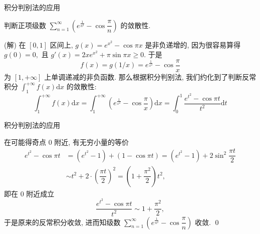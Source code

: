 \begin{frame}{积分判别法的应用}

\begin{eg}
\begin{center}
判断正项级数 $\sum\limits_{n=1}^\infty \left( e^{\frac{1}{n^2}} - \cos\dfrac{\pi}{n} \right)$ 的敛散性.
\end{center}
\end{eg}

\pause
\vspace{0.6em}

\startproof[bg=yellow, fg=red](解)
在 $[0, 1]$ 区间上, $g(x) = e^{x^2} - \cos\pi x$ 是非负递增的, 因为很容易算得 $g(0) = 0,$ 且 $g'(x) = 2xe^{x^2} + \pi \sin\pi x \geqslant 0.$ 于是
\[f(x) = g(1/x) = e^{\frac{1}{x^2}} - \cos\dfrac{\pi}{x}\]
为 $[1, +\infty]$ 上单调递减的非负函数. 那么根据积分判别法, 我们约化到了判断反常积分 $\displaystyle \int_1^{+\infty} f(x) \mathrm{d} x$ 的敛散性:
\[
\int_1^{+\infty} f(x) \mathrm{d} x = \int_1^{+\infty} \left( e^{\frac{1}{x^2}} - \cos\dfrac{\pi}{x} \right) \mathrm{d} x = \int_0^1 \dfrac{e^{t^2} - \cos\pi t}{t^2} \mathrm{d} t
\]

\end{frame}


\begin{frame}{积分判别法的应用}

在可能得奇点 $0$ 附近, 有无穷小量的等价
\begin{align*}
e^{t^2} - \cos\pi t & = (e^{t^2} - 1) + (1 - \cos\pi t) = (e^{t^2} - 1) + 2 \sin^2 \dfrac{\pi t}{2} \\
& \sim t^2 + 2 \cdot \left( \dfrac{\pi t}{2} \right)^2 = \left( 1 + \dfrac{\pi^2}{2} \right) t^2,
\end{align*}
即在 $0$ 附近成立
\[\dfrac{e^{t^2} - \cos\pi t}{t^2} \sim 1 + \dfrac{\pi^2}{2},\]
于是原来的反常积分收敛, 进而知级数 $\sum\limits_{n=1}^\infty \left( e^{\frac{1}{n^2}} - \cos\dfrac{\pi}{n} \right)$ 收敛.
\qed

\end{frame}


